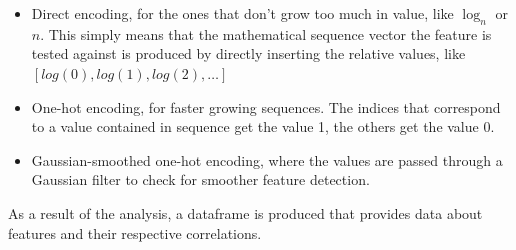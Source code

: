 \documentclass[
  a4paper, twoside, 10pt, titlepage]{book}
\providecommand{\tightlist}{%
  \setlength{\itemsep}{0pt}\setlength{\parskip}{0pt}}
\begin{document}
\begin{itemize}
\tightlist
\item
  Direct encoding, for the ones that don't grow too much in value, like
  \(\log_n\) or \(n\). This simply means that the mathematical sequence
  vector the feature is tested against is produced by directly inserting
  the relative values, like \([log(0), log(1),
  log(2), \ldots]\)
\item
  One-hot encoding, for faster growing sequences. The indices that
  correspond to a value contained in sequence get the value 1, the
  others get the value 0.
\item
  Gaussian-smoothed one-hot encoding, where the values are passed
  through a Gaussian filter to check for smoother feature detection.
\end{itemize}

As a result of the analysis, a dataframe is produced that provides data
about features and their respective correlations.
\end{document}
